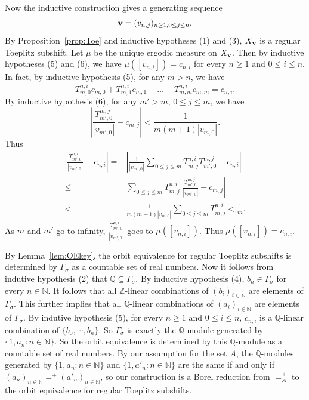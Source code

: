 \documentclass{amsart}
\theoremstyle{definition}
\theoremstyle{problem}
\theoremstyle{remark}
\numberwithin{equation}{section}
\begin{document}
Now the inductive construction gives a generating sequence
$$ {\bf v}=(v_{n,j})_{n\geq 1, 0\le j\le n}. $$ 
By Proposition~\ref{prop:Toe} and inductive hypotheses (1) and (3), $X_{\bf v}$ is a regular Toeplitz subshift. Let $\mu$ be the unique ergodic measure on $X_{\bf v}$. Then by inductive hypotheses (5) and (6), we have $\mu([v_{n,i}])=c_{n,i}$ 
 for every $n\geq 1$ and $0\le i\le n$. In fact, by inductive hypothesis (5), for any $m>n$, we have 
$$T_{m,0}^{n,i}c_{m,0}+T_{m,1}^{n,i}c_{m,1}+\dots+ T_{m,m}^{n,i}c_{m,m}=c_{n,i}.$$
By inductive hypothesis (6), for any $m'>m$, $0 \le j \le m$, we have 
$$ \left|\frac{T_{m',0}^{m,j}}{|v_{m',0}|}-c_{m,j}\right|< \frac{1}{m(m+1)|v_{m,0}|}.$$ Thus 
\begin{align*}
 \left| \frac{T_{m',0}^{n,i}}{|v_{m',0}|}-c_{n,i} \right| = & \left|\frac{1}{|v_{m',0}|}\sum_{0\le j \le m}T_{m,j}^{n,i}T_{m',0}^{m,j}-c_{n,i}\right| \\
 \leq & \sum_{0\le j \le m} T_{m,j}^{n,i}\left|\frac{T_{m',0}^{m,j}}{|v_{m',0}|}-c_{m,j}\right| \\
<& \frac{1}{m(m+1)|v_{m,0}|}\sum_{0\le j \le m} T_{m,j}^{n,i} < \frac{1}{m}.
\end{align*}
As $m$ and $m'$ go to infinity,  $\frac{T_{m',0}^{n,i}}{|v_{m',0}|}$ goes to $\mu([v_{n,i}])$. Thus $\mu([v_{n,i}])=c_{n,i}$.

By Lemma~\ref{lem:OEkey}, the orbit equivalence for regular Toeplitz subshifts is determined by $\Gamma_{\sigma}$ as a countable set of real numbers. Now it follows from indutive hypothesis (2) that $\mathbb{Q}\subseteq \Gamma_\sigma$. By inductive hypothesis (4), $b_n\in \Gamma_{\sigma}$ for every $n\in\mathbb{N}$. It follows that all $\mathbb{Z}$-linear combinations of $(b_i)_{i\in\mathbb{N}}$ are elements of $\Gamma_{\sigma}$. This further implies that all $\mathbb{Q}$-linear combinations of $(a_i)_{i\in\mathbb{N}}$ are elements of $\Gamma_{\sigma}$. By indutive hypothesis (5), for every $n\geq 1$ and $0\le i\le n$, $c_{n,i}$ is a $\mathbb{Q}$-linear combination of $\{b_0,\cdots, b_n\}$. So $\Gamma_{\sigma}$ is exactly the $\mathbb{Q}$-module generated by $\{1, a_n\colon n\in\mathbb{N}\}$. So the orbit equivalence is determined by this $\mathbb{Q}$-module as a countable set of real numbers. By our assumption for the set $A$, the $\mathbb{Q}$-modules generated by $\{1, a_n\colon n\in\mathbb{N}\}$ and $\{1, a'_n\colon n\in\mathbb{N}\}$ are the same if and only if $(a_n)_{n\in\mathbb{N}}=^+(a'_n)_{n\in\mathbb{N}}$, so our construction is a Borel reduction from $=^+_A$ to the orbit equivalence for regular Toeplitz subshifts.
\end{document}
